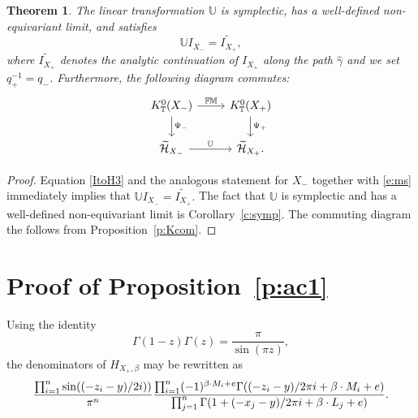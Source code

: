 \documentclass[11pt]{article}
\numberwithin{equation}{section}
\newtheorem{Theorem}{Theorem}[section]
\numberwithin{equation}{section}
\newcommand{\cc}[1]{\mathcal{#1}} %
\newcommand{\UU}{\mathbb{U}}
\newcommand{\torus}{\mathbb{T}}
\newcommand{\FM}{\mathbb{FM}}
\newcommand{\MB}{M}
\newcommand{\LB}{L}
\newcommand{\z}{z}
\newcommand{\x}{x}
\newcommand{\y}{y}
\begin{document}
\begin{Theorem} \label{t:st3}
The linear transformation $\UU$ is symplectic, has a well-defined non-equivariant limit, and satisfies
\[
\UU I_{X_{-}} =\widetilde{I_{X_{+}}},
\]
where $\widetilde{I_{X_{+}}}$ denotes the analytic continuation of $I_{X_{+}}$ along the path $\hat \gamma$ and we set $q_+^{-1} = q_-$.
Furthermore, the following diagram commutes:
\[
\begin{tikzcd}
K^0_\torus(X_{-}) \ar[r, "\FM"] \ar[d, "\Psi_-"] & K^0_\torus(X_{+}) \ar[d, "\Psi_+"] \\
\widetilde{\cc H}_{X_{-}} \ar[r, "\UU"] & \widetilde{\cc H}_{X_{+}}.
\end{tikzcd}
\]
\end{Theorem}
\begin{proof}
Equation \eqref{ItoH3} and the analogous statement for $X_-$ together with \eqref{e:ms} immediately implies that $\UU I_{X_{-}} =\widetilde{I_{X_{+}}}.$ The fact that $\UU$ is symplectic and has a well-defined non-equivariant limit is Corollary~\ref{c:symp}. The commuting diagram the follows from Proposition~\ref{p:Kcom}.
\end{proof}

\appendix\setcounter{section}{0}
\section{Proof of Proposition~\ref{p:ac1}}\label{appendix}

Using the identity
\begin{equation}\label{e:Gamma}\Gamma(1-z) \Gamma(z) = \frac{\pi}{\sin(\pi z)},\end{equation}
 the denominators of $H_{X_{+}, \beta}$ may be rewritten as
\[
\frac{ \prod_{i=1}^n \sin( (-\z_i -\y)/2 {\rm i}) )}{\pi^n}
\frac{\prod_{i=1}^n (-1)^{\beta \cdot \MB_i + e}\Gamma((-\z_i - \y)/2 \pi {\rm i} + \beta \cdot \MB_i + e)}
{\prod_{j=1}^n \Gamma(1 + (- \x_j - \y)/2 \pi {\rm i} + \beta \cdot \LB_j+e) }.
\]
\end{document}
